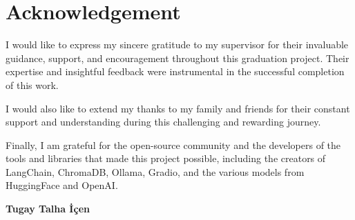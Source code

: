 \chapter*{Acknowledgement}

I would like to express my sincere gratitude to my supervisor for their invaluable guidance, support, and encouragement throughout this graduation project. Their expertise and insightful feedback were instrumental in the successful completion of this work.

I would also like to extend my thanks to my family and friends for their constant support and understanding during this challenging and rewarding journey.

Finally, I am grateful for the open-source community and the developers of the tools and libraries that made this project possible, including the creators of LangChain, ChromaDB, Ollama, Gradio, and the various models from HuggingFace and OpenAI.

\vspace{1cm}
\begin{flushright}
\textbf{Tugay Talha İçen} %
\end{flushright}
\clearpage